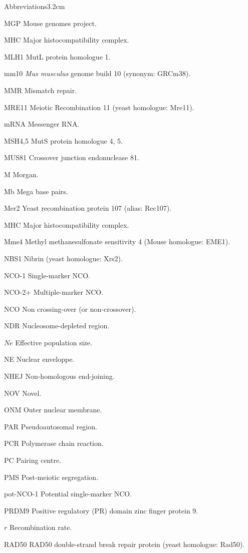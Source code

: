 \begin{mclistof}{Abbreviations}{3.2cm}
\item[MGP] Mouse genomes project.
\item[MHC] Major histocompatibility complex.
\item[MLH1] MutL protein homologue 1.
\item[mm10] \textit{Mus musculus} genome build 10 (synonym: GRCm38).
\item[MMR] Mismatch repair.
\item[MRE11] Meiotic Recombination 11 (yeast homologue: Mre11).
\item[mRNA] Messenger RNA\@.
\item[MSH4,5] MutS protein homologue 4, 5.
\item[MUS81] Crossover junction endonuclease 81.
\item[M] Morgan.
\item[Mb] Mega base pairs.
\item[Mer2] Yeast recombination protein 107 (alias: Rec107).
\item[MHC] Major histocompatibility complex.
\item[Mms4] Methyl methanesulfonate sensitivity 4 (Mouse homologue: EME1).
\item[NBS1] Nibrin (yeast homologue: Xrs2).
\item[NCO-1] Single-marker NCO\@.
\item[NCO-2+] Multiple-marker NCO\@.
\item[NCO] Non crossing-over (or non-crossover).
\item[NDR] Nucleosome-depleted region.
\item[$Ne$] Effective population size.
\item[NE] Nuclear enveloppe.
\item[NHEJ] Non-homologous end-joining.
\item[NOV] Novel.
\item[ONM] Outer nuclear membrane.
\item[PAR] Pseudoautosomal region.
\item[PCR] Polymerase chain reaction.
\item[PC] Pairing centre.
\item[PMS] Post-meiotic segregation.
\item[pot-NCO-1] Potential single-marker NCO\@.
\item[PRDM9] Positive regulatory (PR) domain zinc finger protein 9.
\item[$r$] Recombination rate.
\item[RAD50] RAD50 double-strand break repair protein (yeast homologue: Rad50).

\end{mclistof}
